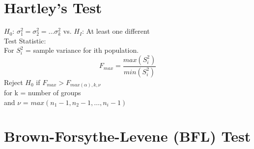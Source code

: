 \documentclass[10pt]{article}
\begin{document}
\begin{multicols}{2}
\section{Hartley's Test}
$H_{0}$: $\sigma^{2}_{1} = \sigma^{2}_{2} = \ldots \sigma^{2}_{k}$ vs. $H_{I}$: At least one different\\
Test Statistic:\\
For $S_{i}^{2}$ = sample variance for ith population.
$$F_{max} = \frac{max(S_{i}^{2})}{min(S_{i}^{2})}$$
Reject $H_{0}$ if $F_{max}>F_{max(\alpha),k,\nu}$\\
for k = number of groups \\
and $\nu$ = $max(n_{1}-1, n_{2}-1, \ldots, n_{i}-1)$

\section{Brown-Forsythe-Levene (BFL) Test}


\end{multicols}	
\end{document}

